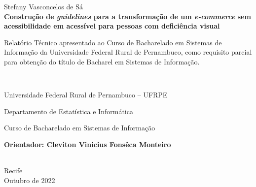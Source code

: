 \begin{titlepage}
%

{\center
{\large Stefany Vasconcelos de Sá}\\[3cm]
{\Large \bf Construção de \textit{guidelines} para a transformação de um \textit{e-commerce} sem acessibilidade em acessível para pessoas com deficiência visual}\\[2.0cm]


{\raggedleft
\begin{minipage}[t]{8.3cm}
\setlength{\baselineskip}{0.25in}
Relatório Técnico apresentado ao Curso de Bacharelado em Sistemas de Informação da Universidade Federal Rural de Pernambuco, como requisito parcial para obtenção do título de Bacharel em Sistemas de Informação.
\end{minipage}\\[2cm]}

\begin{center}
	Universidade Federal Rural de Pernambuco -- UFRPE
  	\par
  	Departamento de Estatística e Informática
    \par
  	Curso de Bacharelado em Sistemas de Informação
\end{center}

\vspace{3cm}
{\large \bf{Orientador:} Cleviton Vinicius Fonsêca Monteiro}}\\[2.0cm]

\vspace{2cm}
{\center Recife \\[2mm]
Outubro de 2022 \\}






\end{titlepage}